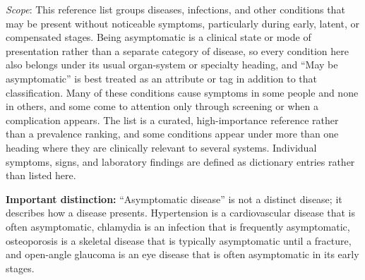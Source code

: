 \small
\noindent\textit{Scope}: This reference list groups diseases, infections, and other conditions that may be present without noticeable symptoms, particularly during early, latent, or compensated stages. Being asymptomatic is a clinical state or mode of presentation rather than a separate category of disease, so every condition here also belongs under its usual organ-system or specialty heading, and ``May be asymptomatic'' is best treated as an attribute or tag in addition to that classification. Many of these conditions cause symptoms in some people and none in others, and some come to attention only through screening or when a complication appears. The list is a curated, high-importance reference rather than a prevalence ranking, and some conditions appear under more than one heading where they are clinically relevant to several systems. Individual symptoms, signs, and laboratory findings are defined as dictionary entries rather than listed here.

\medskip
\noindent\textbf{Important distinction:} ``Asymptomatic disease'' is not a distinct disease; it describes how a disease presents. Hypertension is a cardiovascular disease that is often asymptomatic, chlamydia is an infection that is frequently asymptomatic, osteoporosis is a skeletal disease that is typically asymptomatic until a fracture, and open-angle glaucoma is an eye disease that is often asymptomatic in its early stages.

